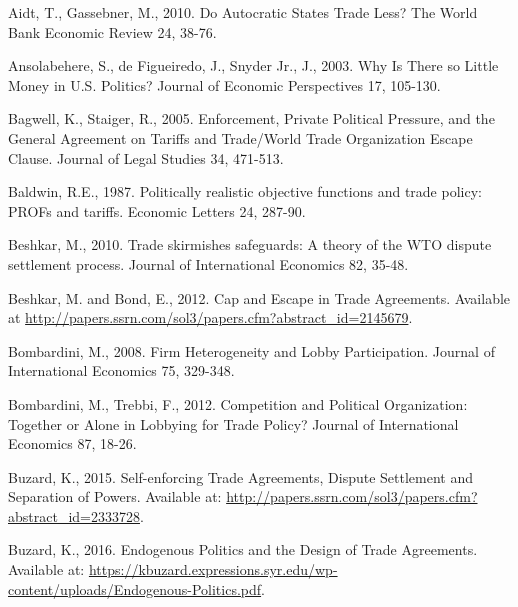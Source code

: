 \documentclass[10pt]{article}
\begin{document}
\begin{list}{}{\setlength{\leftmargin}{0.0in}\setlength{\rightmargin}{0.0in}\setlength{\itemindent}{0.0in}\setlength{\itemsep}{0.1in}}


\item Aidt, T., Gassebner, M., 2010. Do Autocratic States Trade Less? The World Bank Economic Review 24, 38-76.


\item Ansolabehere, S., de Figueiredo, J., Snyder Jr., J., 2003. Why Is There so Little Money in U.S. Politics? Journal of Economic Perspectives 17, 105-130.

\item Bagwell, K., Staiger, R., 2005. Enforcement, Private Political Pressure, and the General Agreement on Tariffs and Trade/World Trade Organization Escape Clause. Journal of Legal Studies 34, 471-513. 

\item Baldwin, R.E., 1987. Politically realistic objective functions and trade policy: PROFs and tariffs. Economic Letters 24, 287-90.

\item Beshkar, M., 2010. Trade skirmishes safeguards: A theory of the WTO dispute settlement process. Journal of International Economics 82, 35-48.

\item Beshkar, M. and Bond, E., 2012. Cap and Escape in Trade Agreements. Available at \url{http://papers.ssrn.com/sol3/papers.cfm?abstract_id=2145679}.

\item Bombardini, M., 2008. Firm Heterogeneity and Lobby Participation. Journal of International Economics 75, 329-348.

\item Bombardini, M., Trebbi, F., 2012. Competition and Political Organization: Together or Alone in Lobbying for Trade Policy? Journal of International Economics 87, 18-26.

\item Buzard, K., 2015. Self-enforcing Trade Agreements, Dispute Settlement and Separation of Powers. Available at: \url{http://papers.ssrn.com/sol3/papers.cfm?abstract_id=2333728}.

\item Buzard, K., 2016. Endogenous Politics and the Design of Trade Agreements. Available at: \url{https://kbuzard.expressions.syr.edu/wp-content/uploads/Endogenous-Politics.pdf}.


\end{list}
\end{document}
